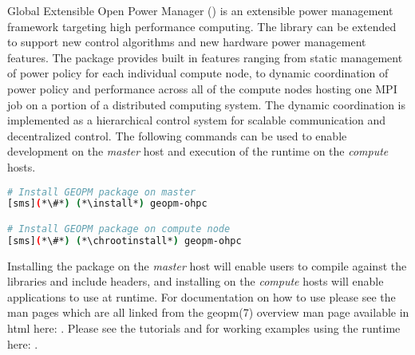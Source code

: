 Global Extensible Open Power Manager (\GEOPM{}) is an extensible power
management framework targeting high performance computing.  The library can be
extended to support new control algorithms and new hardware power management
features.  The \GEOPM{} package provides built in features ranging from static
management of power policy for each individual compute node, to dynamic
coordination of power policy and performance across all of the compute nodes
hosting one MPI job on a portion of a distributed computing system.  The
dynamic coordination is implemented as a hierarchical control system for
scalable communication and decentralized control.  The following
commands can be used to enable development on the {\em master} host and
execution of the \GEOPM{} runtime on the {\em compute} hosts.

\begin{lstlisting}[language=bash,keywords={},upquote=true]
# Install GEOPM package on master
[sms](*\#*) (*\install*) geopm-ohpc

# Install GEOPM package on compute node
[sms](*\#*) (*\chrootinstall*) geopm-ohpc
\end{lstlisting}

\noindent Installing the \GEOPM{} package on the {\em master} host will enable
users to compile against the \GEOPM{} libraries and include headers, and
installing on the {\em compute} hosts will enable applications to use
\GEOPM{} at runtime.  For documentation on how to use \GEOPM{} please see
the \GEOPM{} man pages which are all linked from the geopm(7) overview
man page available in html here:
\href{http://geopm.github.io/man/geopm.7.html}{\color{blue}{http://geopm.github.io/man/geopm.7.html}}.
Please see the \GEOPM{} tutorials and for working examples using the
\GEOPM{} runtime here:
\href{https://github.com/geopm/geopm/tree/dev/tutorial}{\color{blue}{https://github.com/geopm/geopm/tree/dev/tutorial}}.
